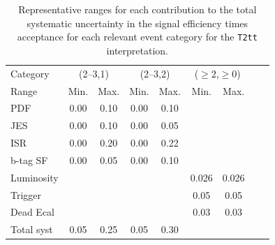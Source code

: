\begin{table}[h!]
  \caption{Representative ranges for each contribution to the total
    systematic uncertainty in the signal efficiency times acceptance
    for each relevant event category for the \texttt{T2tt}
    interpretation.
    \label{tab:sms-syst-t2cc}
  }   
  \centering
  \begin{tabular}{ lcccccccc }
    \hline
    \hline
    Category   & \multicolumn{2}{c}{(2--3,1)} & \multicolumn{2}{c}{(2--3,2)}  & \multicolumn{2}{c}{($\geq 2$,$\geq 0$)} \\
    Range      & Min.   & Max.                & Min.   & Max.                     & Min.  & Max.        \\
    \hline
    PDF        & 0.00   & 0.10                & 0.00   & 0.10                     &         \\
    JES        & 0.00   & 0.10                & 0.00   & 0.05                     &             \\
    ISR        & 0.00   & 0.20                & 0.00   & 0.22                     &             \\
    b-tag SF   & 0.00   & 0.05                & 0.00   & 0.10                     &             \\
    Luminosity &        &                     &        &                          & 0.026 & 0.026        \\
    Trigger    &        &                     &        &                          & 0.05 & 0.05        \\
    Dead Ecal  &        &                     &        &                          & 0.03 & 0.03        \\
    \hline
    Total syst & 0.05   & 0.25                & 0.05   & 0.30                     &      &             \\
    \hline
    \hline
  \end{tabular}
\end{table}

